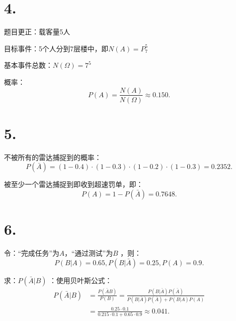 \section*{4. }%
\label{sec:4. }
题目更正：载客量5人

目标事件：5个人分到7层楼中，即$N\left( A \right) =P_{7}^{5}$

基本事件总数：$N\left( \Omega \right) =7^5$

概率： \[
    P\left( A \right) =\frac{N\left( A \right) }{N\left( \Omega \right) }\approx 0.150
.\] 
\section*{5. }%
\label{sec:5. }
不被所有的雷达捕捉到的概率：
\[
    P\left( \bar{A} \right) =\left( 1-0.4 \right) \cdot \left( 1-0.3 \right) \cdot \left( 1-0.2 \right) \cdot \left( 1-0.3 \right) =0.2352
.\] 

被至少一个雷达捕捉到即收到超速罚单，即：
\[
    P\left( A \right) =1-P\left( \bar{A} \right) =0.7648
.\] 
\section*{6. }%
\label{sec:6. }
令：“完成任务”为$A$，“通过测试”为$B$ ，则：\[
    P\left( B|A \right) =0.65,P\left( B|\bar{A} \right) =0.25,P\left( A \right) =0.9
.\] 

求：$P\left( \bar{A}|B \right) $ ：使用贝叶斯公式：
\begin{align*}
    P\left( \bar{A}|B \right) &=\frac{P\left( \bar{A}B \right) }{P\left( B \right) } =\frac{P\left( B|\bar{A} \right) P\left( \bar{A} \right) }{P\left( B|\bar{A} \right)P\left( \bar{A} \right) +P\left( B|A \right) P\left( A \right)  }\\
                              &=\frac{0.25\cdot 0.1}{0.215\cdot 0.1+0.65\cdot 0.9}\approx 0.041
.\end{align*}

